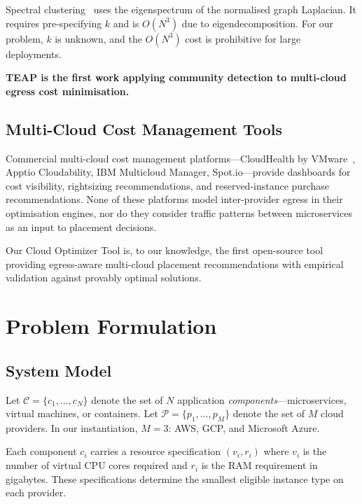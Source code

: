 \documentclass[sigconf,10pt]{acmart}
\begin{document}
Spectral clustering~\cite{vonluxburg2007} uses the eigenspectrum of the normalised
graph Laplacian.
It requires pre-specifying $k$ and is $O(N^3)$ due to eigendecomposition.
For our problem, $k$ is unknown, and the $O(N^3)$ cost is prohibitive for
large deployments.

\textbf{TEAP is the first work applying community detection to multi-cloud egress
cost minimisation.}

\subsection{Multi-Cloud Cost Management Tools}

Commercial multi-cloud cost management platforms---CloudHealth by VMware~\cite{cloudhealth},
Apptio Cloudability, IBM Multicloud Manager, Spot.io---provide dashboards for
cost visibility, rightsizing recommendations, and reserved-instance purchase
recommendations.
None of these platforms model inter-provider egress in their optimisation engines,
nor do they consider traffic patterns between microservices as an input to placement
decisions.

Our Cloud Optimizer Tool is, to our knowledge, the first open-source tool providing
egress-aware multi-cloud placement recommendations with empirical validation against
provably optimal solutions.

\section{Problem Formulation}\label{sec:problem}

\subsection{System Model}

Let $\mathcal{C} = \{c_1,\ldots,c_N\}$ denote the set of $N$ application
\emph{components}---microservices, virtual machines, or containers.
Let $\mathcal{P} = \{p_1,\ldots,p_M\}$ denote the set of $M$ cloud providers.
In our instantiation, $M = 3$: AWS, GCP, and Microsoft Azure.

Each component $c_i$ carries a resource specification $(v_i, r_i)$ where $v_i$
is the number of virtual CPU cores required and $r_i$ is the RAM requirement in
gigabytes.
These specifications determine the smallest eligible instance type on each provider.
\end{document}
